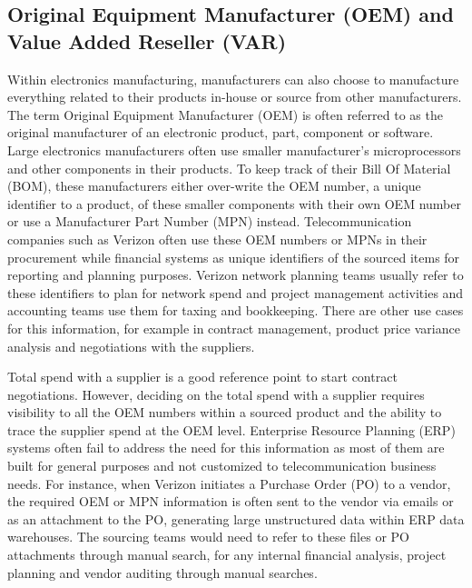 \documentclass[inte,nonblindrev]{informs3} %
\begin{document}
\subsection{Original Equipment Manufacturer (OEM) and Value Added Reseller (VAR)}
Within electronics manufacturing, manufacturers can also choose to manufacture everything related to their products in-house or source from other manufacturers. The term Original Equipment Manufacturer (OEM) is often referred to as the original manufacturer of an electronic product, part, component or software. Large electronics manufacturers often use smaller manufacturer's microprocessors and other components in their products. To keep track of their Bill Of Material (BOM), these manufacturers either over-write the OEM number, a unique identifier to a product, of these smaller components with their own OEM number or use a Manufacturer Part Number (MPN) instead. Telecommunication companies such as Verizon often use these OEM numbers or MPNs in their procurement while financial systems as unique identifiers of the sourced items for reporting and planning purposes. Verizon network planning teams usually refer to these identifiers to plan for network spend and project management activities and accounting teams use them for taxing and bookkeeping. There are other use cases for this information, for example in contract management, product price variance analysis and negotiations with the suppliers. 

Total spend with a supplier is a good reference point to start contract negotiations. However, deciding on the total spend with a supplier requires visibility to all the OEM numbers within a sourced product and the ability to trace the supplier spend at the OEM level. Enterprise Resource Planning (ERP) systems often fail to address the need for this information as most of them are built for general purposes and not customized to telecommunication business needs. For instance, when Verizon initiates a Purchase Order (PO) to a vendor, the required OEM or MPN information is often sent to the vendor via emails or as an attachment to the PO, generating large unstructured data within ERP data warehouses. The sourcing teams would need to refer to these files or PO attachments through manual search, for any internal financial analysis, project planning and vendor auditing through manual searches.
\end{document}
